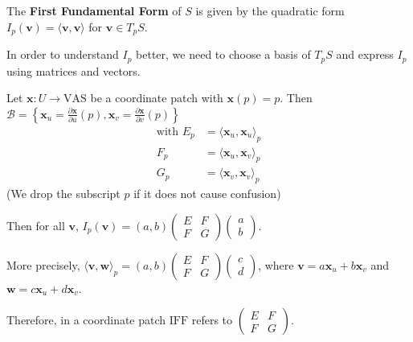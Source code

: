 \documentclass{article}
\begin{document}
\begin{definition}
The \textbf{First Fundamental Form} of $S$ is given by the quadratic form $I_p(\mathbf{v}) = \langle \mathbf{v}, \mathbf{v} \rangle$ for $\mathbf{v} \in T_p S$.
\end{definition}
In order to understand $I_p$ better, we need to choose a basis of $T_p S$ and express $I_p$ using matrices and vectors.

Let $\mathbf{x}: U \to \text{VAS}$ be a coordinate patch with $\mathbf{x}(p)=p$.
Then $\mathcal{B} = \left\{ \mathbf{x}_u = \frac{\partial \mathbf{x}}{\partial u} (p), \mathbf{x}_v = \frac{\partial \mathbf{x}}{\partial v} (p) \right\}$
\begin{align*}
\text{with } E_p &= \langle \mathbf{x}_u, \mathbf{x}_u \rangle_p \\
F_p &= \langle \mathbf{x}_u, \mathbf{x}_v \rangle_p \\
G_p &= \langle \mathbf{x}_v, \mathbf{x}_v \rangle_p
\end{align*}
(We drop the subscript $p$ if it does not cause confusion)

Then for all $\mathbf{v}$, $I_p(\mathbf{v}) = (a, b) \begin{pmatrix} E & F \\ F & G \end{pmatrix} \begin{pmatrix} a \\ b \end{pmatrix}$.

More precisely, $\langle \mathbf{v}, \mathbf{w} \rangle_p = (a, b) \begin{pmatrix} E & F \\ F & G \end{pmatrix} \begin{pmatrix} c \\ d \end{pmatrix}$, where $\mathbf{v} = a \mathbf{x}_u + b \mathbf{x}_v$ and $\mathbf{w} = c \mathbf{x}_u + d \mathbf{x}_v$.

Therefore, in a coordinate patch $\text{IFF}$ refers to $\begin{pmatrix} E & F \\ F & G \end{pmatrix}$.
\end{document}
